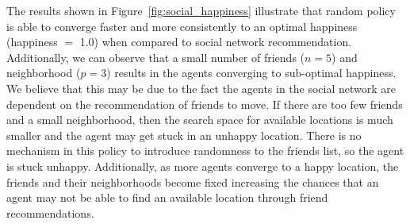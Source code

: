 \documentclass[12pt, titlepage]{article}
\newcommand{\figref}[1]{Figure~\ref{#1}}
\begin{document}
	\par The results shown in \figref{fig:social_happiness} illustrate that
	random policy is able to converge faster and more consistently to an optimal
	happiness (happiness $=$ 1.0) when compared to social network recommendation.
	Additionally, we can observe that a small number of friends ($n=5$) and
	neighborhood ($p=3$) results in the agents converging to sub-optimal
	happiness.
	We believe that this may be due to the fact the agents in the social network
	are dependent on the recommendation of friends to move.
	If there are too few friends and a small neighborhood, then the search space
	for available locations is much smaller and the agent may get stuck in an
	unhappy location.
	There is no mechanism in this policy to introduce randomness to the friends
	list, so the agent is stuck unhappy.
	Additionally, as more agents converge to a happy location, the friends and
	their neighborhoods become fixed increasing the chances that an agent may not
	be able to find an available location through friend recommendations.
	\newpage
\end{document}
